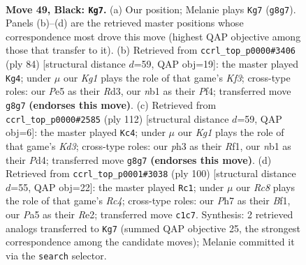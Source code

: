 \documentclass[11pt]{article}
\begin{document}
\clearpage

\begin{figure}[p]\centering
\begin{subfigure}{0.46\textwidth}\centering
\resizebox{\linewidth}{!}{%
\newchessgame
\chessboard[
  setfen={6k1/5p1p/1n4p1/p3p1P1/P3P3/1P2K1RP/6P1/RNrr4 b - - 13 49},
  showmover=false,
  pgfstyle=straightmove, color=movearrow, markmove={g8-g7}
]}
\caption{}
\end{subfigure}\hfill
\begin{subfigure}{0.46\textwidth}\centering
\resizebox{\linewidth}{!}{%
\newchessgame
\chessboard[
  setfen={8/p1r1kp2/4p2p/2p2r2/R4P1P/PP1R1K2/2P5/8 w - - 3 43},
  showmover=false,
  pgfstyle=straightmove, color=movearrow, markmove={f3-g4}
]}
\caption{}
\end{subfigure}
\\[4pt]
\begin{subfigure}{0.46\textwidth}\centering
\resizebox{\linewidth}{!}{%
\newchessgame
\chessboard[
  setfen={8/1p1k4/p1pr1p1r/P5p1/1P1PR1P1/3KP3/8/5R2 w - - 15 57},
  showmover=false,
  pgfstyle=straightmove, color=movearrow, markmove={d3-c4}
]}
\caption{}
\end{subfigure}\hfill
\begin{subfigure}{0.46\textwidth}\centering
\resizebox{\linewidth}{!}{%
\newchessgame
\chessboard[
  setfen={4r3/1p2r2p/2p4k/p1P1Pp1P/PnRP4/5K2/4R3/5B2 w - - 1 51},
  showmover=false,
  pgfstyle=straightmove, color=movearrow, markmove={c4-c1}
]}
\caption{}
\end{subfigure}
\caption{\textbf{Move 49, Black: \texttt{Kg7}.} (a) Our position; Melanie plays \texttt{Kg7} (\texttt{g8g7}). Panels (b)--(d) are the retrieved master positions whose correspondence most drove this move (highest QAP objective among those that transfer to it). (b) Retrieved from \texttt{ccrl\_top\_p0000\#3406} (ply 84) [structural distance $d$=59, QAP obj=19]: the master played \texttt{Kg4}; under $\mu$ our \emph{Kg1} plays the role of that game's \emph{Kf3}; cross-type roles: our \emph{P}e5 as their \emph{R}d3, our \emph{n}b1 as their \emph{P}f4; transferred move \texttt{g8g7} \textbf{(endorses this move)}. (c) Retrieved from \texttt{ccrl\_top\_p0000\#2585} (ply 112) [structural distance $d$=59, QAP obj=6]: the master played \texttt{Kc4}; under $\mu$ our \emph{Kg1} plays the role of that game's \emph{Kd3}; cross-type roles: our \emph{p}h3 as their \emph{R}f1, our \emph{n}b1 as their \emph{P}d4; transferred move \texttt{g8g7} \textbf{(endorses this move)}. (d) Retrieved from \texttt{ccrl\_top\_p0001\#3038} (ply 100) [structural distance $d$=55, QAP obj=22]: the master played \texttt{Rc1}; under $\mu$ our \emph{Rc8} plays the role of that game's \emph{Rc4}; cross-type roles: our \emph{P}h7 as their \emph{B}f1, our \emph{P}a5 as their \emph{R}e2; transferred move \texttt{c1c7}. Synthesis: 2 retrieved analogs transferred to \texttt{Kg7} (summed QAP objective 25, the strongest correspondence among the candidate moves); Melanie committed it via the \texttt{search} selector.}
\label{fig:thought-m97}
\end{figure}
\end{document}
